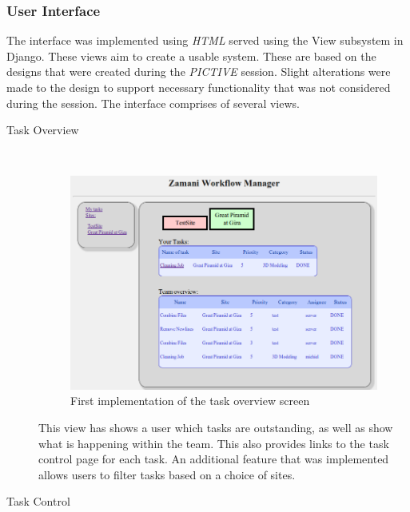 \documentclass[12pt,a4paper]{report}
\begin{document}
\subsubsection{User Interface}
The interface was implemented using \emph{HTML} served using the View subsystem in Django.
These views aim to create a usable system. These are based on the designs that were created
during the \emph{PICTIVE} session. Slight alterations were made to the design to support
necessary functionality that was not considered during the session. The interface comprises of several
views.
\begin{description}
\item[Task Overview] \hfill \\
    \begin{figure}[!h]
        \begin{center}
            \includegraphics[scale=0.4]{figures/task_overview_impl2.png}
        \end{center}
        \caption{First implementation of the task overview screen}
        \label{task_overview_impl2}
    \end{figure}
    This view has shows a user which tasks are outstanding, as well as show what is
    happening within the team. This also provides links to the task control page for each task.
    An additional feature that was implemented allows users to filter tasks based on a choice
    of sites.
\item[Task Control] \hfill \\
    \begin{figure}[!h]
        \begin{center}

\end{center}
\end{figure}
\end{description}
\end{document}
